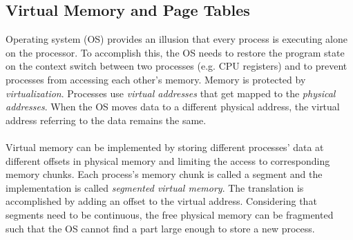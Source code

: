 \subsection{Virtual Memory and Page Tables} \label{sec:vm}

Operating system (OS) provides an illusion that every process is executing alone
on the processor. To accomplish this, the OS needs to restore the program state
on the context switch between two processes (e.g. CPU registers) and to prevent 
processes from accessing each other's memory. Memory is protected by
\emph{virtualization}. Processes use \emph{virtual addresses} that get mapped to
the \emph{physical addresses}. When the OS moves data to a different physical 
address, the virtual address referring to the data remains the same.
\\
\\
Virtual memory can be implemented by storing different processes' data at 
different offsets in physical memory and limiting the access to corresponding 
memory chunks. Each process's memory chunk is called a segment and the 
implementation is called \emph{segmented virtual memory}. The translation is 
accomplished by adding an offset to the virtual address. Considering that 
segments need to be continuous, the free physical memory can be fragmented
such that the OS cannot find a part large enough to store a new process.
\\
\\
